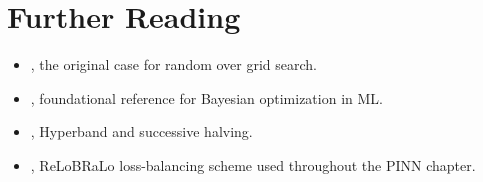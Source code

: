 \documentclass[11pt,a4paper]{report}
\begin{document}
\section*{Further Reading}
\begin{itemize}[itemsep=2pt]
\item \citet{bergstra2012random}, the original case for random over grid search.
\item \citet{snoek2012practical}, foundational reference for Bayesian optimization in ML.
\item \citet{li2018hyperband}, Hyperband and successive halving.
\item \citet{bischof2025relobralo}, ReLoBRaLo loss-balancing scheme used throughout the PINN chapter.
\end{itemize}
\end{document}
